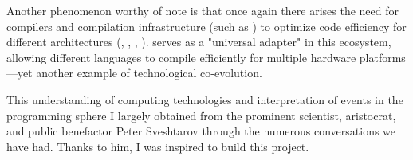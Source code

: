 Another phenomenon worthy of note is that once again there arises
the need for compilers and compilation infrastructure (such as ) to optimize code efficiency for different architectures (, , , ).  serves as a "universal adapter" in this ecosystem, allowing different languages to compile efficiently for multiple hardware platforms—yet another example of technological co-evolution.

This understanding of computing technologies and interpretation of events in the programming sphere
I largely obtained from the prominent scientist, aristocrat, and public benefactor Peter Sveshtarov through the numerous conversations we have had.
Thanks to him, I was inspired to build this project.

